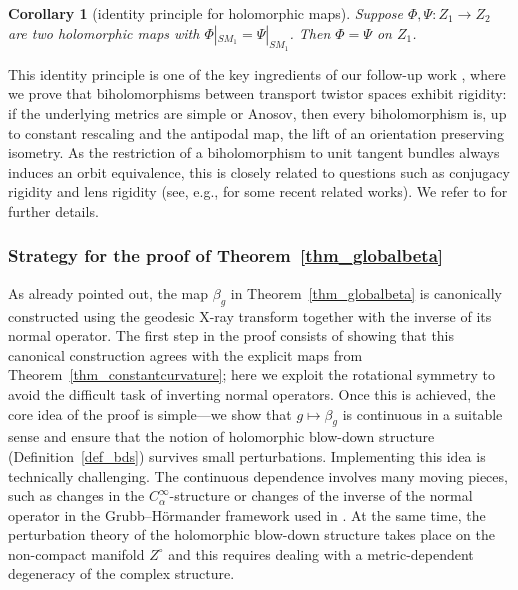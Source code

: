 \documentclass[pdftex]{sigma}
\numberwithin{equation}{section}
\newtheorem{Corollary}[Theorem]{Corollary}
\theoremstyle{definition}
\newcommand{\1}{{\bf 1}}
\begin{document}
\begin{Corollary}[identity principle for holomorphic maps]\label{cor_maps}
Suppose $\Phi,\Psi\colon Z_1\rightarrow Z_2$ are two holomorphic maps with $\Phi|_{SM_1}=\Psi|_{SM_1}$. Then $\Phi=\Psi$ on $Z_1$.
\end{Corollary}

This identity principle is one of the key ingredients of our follow-up work \cite{BMP24b}, where we prove that biholomorphisms between transport twistor spaces exhibit rigidity: if the underlying metrics are simple or Anosov, then every biholomorphism is, up to constant rescaling and the antipodal map, the lift of an orientation preserving isometry. As the restriction of a biholomorphism to unit tangent bundles always induces an orbit equivalence,
this is closely related to questions such as conjugacy rigidity and lens rigidity (see, e.g., \cite{CGL23,GoRo23,GLP25,GM18} for some recent related works). We refer to \cite{BMP24b} for further details.

\subsubsection[Strategy for the proof of Theorem 1.3]{Strategy for the proof of Theorem~\ref{thm_globalbeta}}
As already pointed out, the map $\beta_g$ in Theorem~\ref{thm_globalbeta} is canonically constructed using the geodesic X-ray transform together with the inverse of its normal operator. The first step in the proof consists of showing that this canonical construction agrees with the explicit maps from Theorem~\ref{thm_constantcurvature}; here we exploit the rotational symmetry to avoid the difficult task of inverting normal operators. Once this is achieved, the core idea of the proof is simple---we show that
$g\mapsto \beta_g$ is continuous in a suitable sense and ensure that the notion of holomorphic blow-down structure (Definition~\ref{def_bds}) survives small perturbations. Implementing this idea is technically challenging. The continuous dependence involves many moving pieces, such as changes in the $C_\alpha^\infty$-structure or changes of the inverse of the normal operator in the Grubb--H{\"o}rmander framework used in \cite{MNP19a}. At the same time, the perturbation theory of the holomorphic blow-down structure takes place on the non-compact manifold $Z^\circ$ and this requires dealing with a metric-dependent degeneracy of the complex structure.
\end{document}
